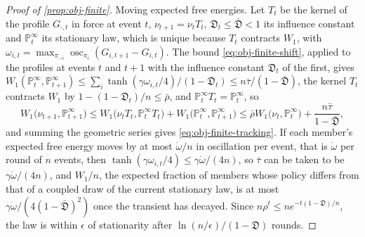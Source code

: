 \begin{proof}[Proof of \cref{prop:obj-finite}]
Moving expected free energies. Let $T_t$ be the kernel of the profile $G_{\cdot,t}$ in force at event $t$, $\nu_{t+1}=\nu_tT_t$, $\mathfrak D_t\le\bar{\mathfrak D}<1$ its influence constant and $\mathbb P^\infty_t$ its stationary law, which is unique because $T_t$ contracts $W_1$, with $\omega_{i,t}=\max_{\pi_{-i}}\operatorname{osc}_{\pi_i}(G_{i,t+1}-G_{i,t})$. The bound \eqref{eq:obj-finite-shift}, applied to the profiles at events $t$ and $t+1$ with the influence constant $\mathfrak D_t$ of the first, gives $W_1(\mathbb P^\infty_t,\mathbb P^\infty_{t+1})\le\sum_i\tanh(\gamma\omega_{i,t}/4)/(1-\mathfrak D_t)\le n\bar\tau/(1-\bar{\mathfrak D})$, the kernel $T_t$ contracts $W_1$ by $1-(1-\mathfrak D_t)/n\le\bar\rho$, and $\mathbb P^\infty_tT_t=\mathbb P^\infty_t$, so
\begin{equation*}
W_1\bigl(\nu_{t+1},\mathbb P^\infty_{t+1}\bigr)\le W_1\bigl(\nu_tT_t,\mathbb P^\infty_tT_t\bigr)+W_1\bigl(\mathbb P^\infty_t,\mathbb P^\infty_{t+1}\bigr)\le\bar\rho W_1\bigl(\nu_t,\mathbb P^\infty_t\bigr)+\frac{n\bar\tau}{1-\bar{\mathfrak D}},
\end{equation*}
and summing the geometric series gives \eqref{eq:obj-finite-tracking}. If each member's expected free energy moves by at most $\dot\omega/n$ in oscillation per event, that is $\dot\omega$ per round of $n$ events, then $\tanh(\gamma\omega_{i,t}/4)\le\gamma\dot\omega/(4n)$, so $\bar\tau$ can be taken to be $\gamma\dot\omega/(4n)$, and $W_1/n$, the expected fraction of members whose policy differs from that of a coupled draw of the current stationary law, is at most $\gamma\dot\omega/(4(1-\bar{\mathfrak D})^2)$ once the transient has decayed. Since $n\rho^t\le ne^{-t(1-\mathfrak D)/n}$, the law is within $\epsilon$ of stationarity after $\ln(n/\epsilon)/(1-\mathfrak D)$ rounds.
\end{proof}

